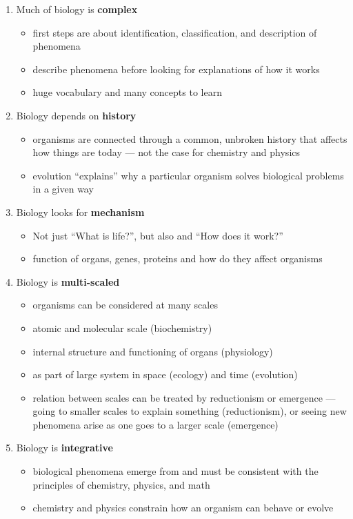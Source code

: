\begin{enumerate}
\item Much of biology is {\bf complex}
  \begin{itemize}
    \item first steps are about identification, classification, and description of phenomena
    \item describe phenomena before looking for explanations of how it works
    \item huge vocabulary and many concepts to learn
  \end{itemize}

\item Biology depends on {\bf history}
  \begin{itemize}
  \item organisms are connected through a common, unbroken history that affects how things are today --- not the case for chemistry and physics
    \item evolution ``explains'' why a particular organism solves biological problems in a given way
  \end{itemize}
  
\item  Biology looks for {\bf mechanism}
  \begin{itemize}
    \item Not just ``What is life?'', but also and ``How does it work?''
    \item function of organs, genes, proteins and how do they affect organisms
  \end{itemize}
  
\item Biology is {\bf multi-scaled}
  \begin{itemize}
    \item organisms can be considered at many scales
    \item atomic and molecular scale (biochemistry)
    \item internal structure and functioning of organs (physiology)
    \item as part of large system in space (ecology) and time (evolution)
    \item relation between scales can be treated by reductionism or emergence --- going to smaller scales to explain something (reductionism), or seeing new phenomena arise as one goes to a larger scale (emergence)
  \end{itemize}
  
\item Biology is {\bf integrative}
  \begin{itemize}
   \item biological phenomena emerge from and must be consistent with the principles of chemistry, physics, and math
   \item chemistry and physics constrain how an organism can behave or evolve  
  \end{itemize}
\end{enumerate} 

